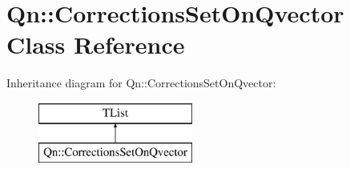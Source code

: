 \hypertarget{classQn_1_1CorrectionsSetOnQvector}{}\section{Qn\+:\+:Corrections\+Set\+On\+Qvector Class Reference}
\label{classQn_1_1CorrectionsSetOnQvector}
Inheritance diagram for Qn\+:\+:Corrections\+Set\+On\+Qvector\+:\begin{figure}[H]
\begin{center}
\leavevmode
\includegraphics[height=2.000000cm]{classQn_1_1CorrectionsSetOnQvector}
\end{center}
\end{figure}
